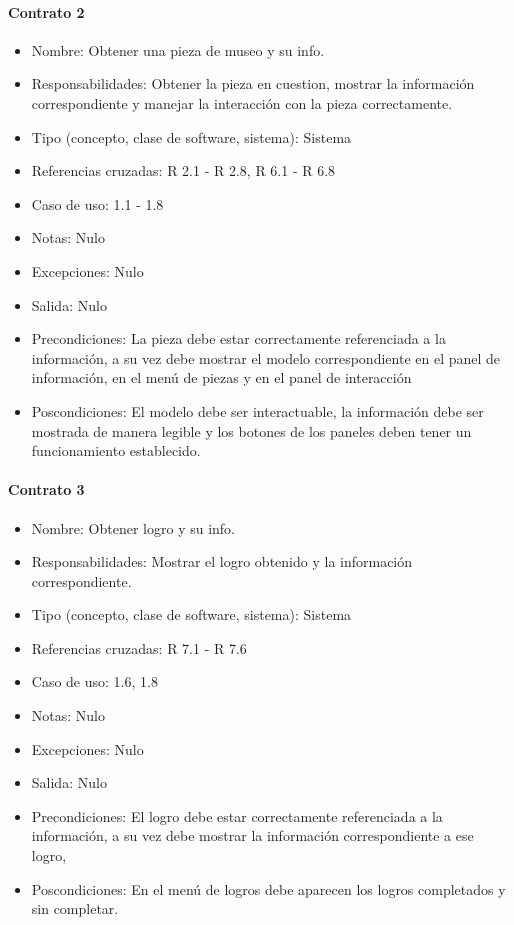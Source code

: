 \paragraph{Contrato 2} 
\begin{itemize}
\item Nombre: Obtener una pieza de museo y su info.
\item Responsabilidades: Obtener la pieza en cuestion, mostrar la información correspondiente y manejar la interacción con la pieza correctamente.
\item Tipo (concepto, clase de software, sistema): Sistema
\item Referencias cruzadas: R 2.1 - R 2.8, R 6.1 - R 6.8
\item Caso de uso: 1.1 - 1.8
\item Notas: Nulo
\item Excepciones: Nulo
\item Salida: Nulo
\item Precondiciones: La pieza debe estar correctamente referenciada a la información, a su vez debe mostrar el modelo correspondiente en el panel de información, en el menú de piezas y en el panel de interacción
\item Poscondiciones: El modelo debe ser interactuable, la información debe ser mostrada de manera legible y los botones de los paneles deben tener un funcionamiento establecido. 
\end{itemize}

\paragraph{Contrato 3} 
\begin{itemize}
\item Nombre: Obtener logro y su info.
\item Responsabilidades: Mostrar el logro obtenido y la información correspondiente.
\item Tipo (concepto, clase de software, sistema): Sistema
\item Referencias cruzadas: R 7.1 - R 7.6
\item Caso de uso: 1.6, 1.8
\item Notas: Nulo
\item Excepciones: Nulo
\item Salida: Nulo
\item Precondiciones:  El logro debe estar correctamente referenciada a la información, a su vez debe mostrar la información correspondiente a ese logro, 
\item Poscondiciones: En el menú de logros debe aparecen los logros completados y sin completar.
\end{itemize}

